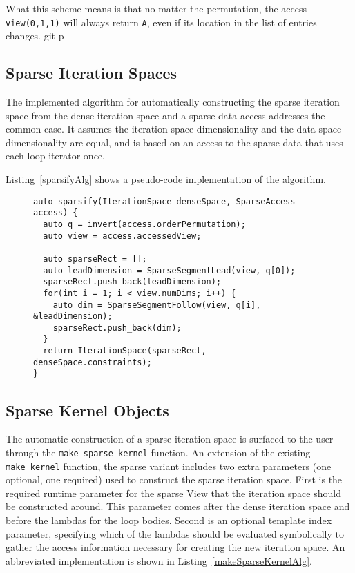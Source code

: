 What this scheme means is that no matter the permutation, the access \verb.view(0,1,1). will always return \verb.A., even if its location in the list of entries changes.
git p
\subsection{Sparse Iteration Spaces}
The implemented algorithm for automatically constructing the sparse iteration space from the dense iteration space and a sparse data access addresses the common case.
It assumes the iteration space dimensionality and the data space dimensionality are equal, and is based on an access to the sparse data that uses each loop iterator once.



Listing~\ref{sparsifyAlg} shows a pseudo-code implementation of the algorithm.

\begin{figure}
\begin{lstlisting}[caption={Abbreviated algorithm for sparsifying a dense iteration space.}, label=sparsifyAlg]
auto sparsify(IterationSpace denseSpace, SparseAccess access) {
  auto q = invert(access.orderPermutation);
  auto view = access.accessedView;

  auto sparseRect = [];
  auto leadDimension = SparseSegmentLead(view, q[0]);
  sparseRect.push_back(leadDimension);
  for(int i = 1; i < view.numDims; i++) {
    auto dim = SparseSegmentFollow(view, q[i], &leadDimension);
    sparseRect.push_back(dim);
  }
  return IterationSpace(sparseRect, denseSpace.constraints);
}
\end{lstlisting}
\end{figure}


\subsection{Sparse Kernel Objects}

The automatic construction of a sparse iteration space is surfaced to the user through the \verb.make_sparse_kernel. function.
An extension of the existing \verb.make_kernel. function, the sparse variant includes two extra parameters (one optional, one required) used to construct the sparse iteration space.
First is the required runtime parameter for the sparse View that the iteration space should be constructed around.
This parameter comes after the dense iteration space and before the lambdas for the loop bodies.
Second is an optional template index parameter, specifying which of the lambdas should be evaluated symbolically to gather the access information necessary for creating the new iteration space.
An abbreviated implementation is shown in Listing~\ref{makeSparseKernelAlg}.

